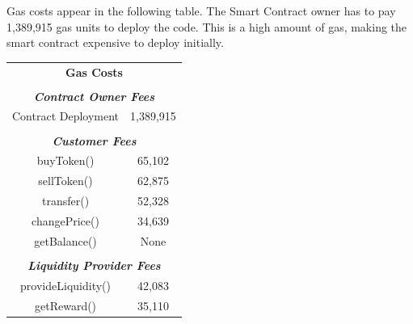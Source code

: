 \documentclass[12pt,a4paper]{article}
\begin{document}
Gas costs appear in the following table. The Smart Contract owner has to pay
1,389,915 gas units to deploy the code. This is a high amount of gas, making the
smart contract expensive to deploy initially. \\

\begin{table}[htpb]
    \begin{center}
        \begin{tabular}{cc}
        \multicolumn{2}{c}{\textbf{Gas Costs}}                                                                \\
        \multicolumn{1}{l}{}                                                & \multicolumn{1}{l}{}            \\ \hline
        \multicolumn{2}{|c|}{\textit{\textbf{Contract Owner Fees}}}                                           \\ \hline
        \multicolumn{1}{|c|}{Contract Deployment}                           & \multicolumn{1}{c|}{1,389,915}  \\ \hline
        \multicolumn{1}{l}{}                                                & \multicolumn{1}{l}{}            \\ \hline
        \multicolumn{2}{|c|}{\textit{\textbf{Customer Fees}}}                                                 \\ \hline
        \multicolumn{1}{|c|}{buyToken()}                                   & \multicolumn{1}{c|}{65,102}   \\ \hline
        \multicolumn{1}{|c|}{sellToken()}                                  & \multicolumn{1}{c|}{62,875}   \\ \hline
        \multicolumn{1}{|c|}{transfer()}                                   & \multicolumn{1}{c|}{52,328}   \\ \hline
        \multicolumn{1}{|c|}{changePrice()}                                & \multicolumn{1}{c|}{34,639}   \\ \hline
        \multicolumn{1}{|c|}{getBalance()}                                 & \multicolumn{1}{c|}{None}   \\ \hline
        \multicolumn{1}{l}{}                                               & \multicolumn{1}{l}{}             \\ \hline
        \multicolumn{2}{|c|}{\textit{\textbf{Liquidity Provider Fees}}}                                       \\ \hline   
        \multicolumn{1}{|c|}{provideLiquidity()}                           & \multicolumn{1}{c|}{42,083}   \\ \hline
        \multicolumn{1}{|c|}{getReward()}                                  & \multicolumn{1}{c|}{35,110}   \\ \hline
        \end{tabular}
    \end{center}
\end{table}
\end{document}
